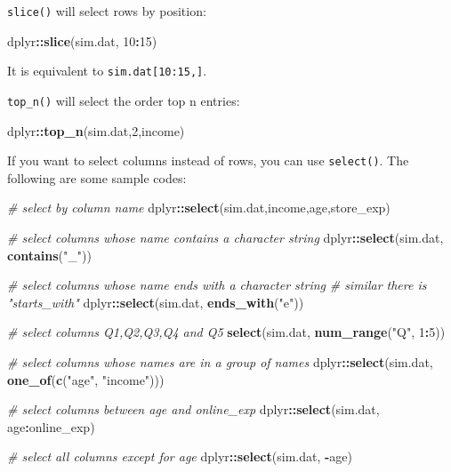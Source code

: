\documentclass[12pt,]{krantz}
\makeatletter
\newenvironment{Shaded}{\begin{snugshade}}{\end{snugshade}}
\newcommand{\KeywordTok}[1]{\textcolor[rgb]{0.27,0.27,0.27}{\textbf{#1}}}
\newcommand{\DecValTok}[1]{\textcolor[rgb]{0.06,0.06,0.06}{#1}}
\newcommand{\StringTok}[1]{\textcolor[rgb]{0.5,0.5,0.5}{#1}}
\newcommand{\CommentTok}[1]{\textcolor[rgb]{0.37,0.37,0.37}{\textit{#1}}}
\newcommand{\OperatorTok}[1]{\textcolor[rgb]{0.43,0.43,0.43}{\textbf{#1}}}
\newcommand{\NormalTok}[1]{#1}
\newenvironment{kframe}{%
\medskip{}
\setlength{\fboxsep}{.8em}
 \def\at@end@of@kframe{}%
 \ifinner\ifhmode%
  \def\at@end@of@kframe{\end{minipage}}%
  \begin{minipage}{\columnwidth}%
 \fi\fi%
 \def\FrameCommand##1{\hskip\@totalleftmargin \hskip-\fboxsep
 \colorbox{shadecolor}{##1}\hskip-\fboxsep
     \hskip-\linewidth \hskip-\@totalleftmargin \hskip\columnwidth}%
 \MakeFramed {\advance\hsize-\width
   \@totalleftmargin\z@ \linewidth\hsize
   \@setminipage}}%
 {\par\unskip\endMakeFramed%
 \at@end@of@kframe}
\renewenvironment{Shaded}{\begin{kframe}}{\end{kframe}}
\theoremstyle{definition}
\theoremstyle{definition}
\theoremstyle{definition}
\theoremstyle{remark}
\makeatother
\begin{document}
\texttt{slice()} will select rows by position:

\begin{Shaded}
\begin{Highlighting}[]
\NormalTok{dplyr}\OperatorTok{::}\KeywordTok{slice}\NormalTok{(sim.dat, }\DecValTok{10}\OperatorTok{:}\DecValTok{15}\NormalTok{) }
\end{Highlighting}
\end{Shaded}

It is equivalent to \texttt{sim.dat{[}10:15,{]}}.

\texttt{top\_n()} will select the order top n entries:

\begin{Shaded}
\begin{Highlighting}[]
\NormalTok{dplyr}\OperatorTok{::}\KeywordTok{top_n}\NormalTok{(sim.dat,}\DecValTok{2}\NormalTok{,income)}
\end{Highlighting}
\end{Shaded}

If you want to select columns instead of rows, you can use
\texttt{select()}. The following are some sample codes:

\begin{Shaded}
\begin{Highlighting}[]
\CommentTok{# select by column name}
\NormalTok{dplyr}\OperatorTok{::}\KeywordTok{select}\NormalTok{(sim.dat,income,age,store_exp)}

\CommentTok{# select columns whose name contains a character string}
\NormalTok{dplyr}\OperatorTok{::}\KeywordTok{select}\NormalTok{(sim.dat, }\KeywordTok{contains}\NormalTok{(}\StringTok{"_"}\NormalTok{))}

\CommentTok{# select columns whose name ends with a character string}
\CommentTok{# similar there is "starts_with"}
\NormalTok{dplyr}\OperatorTok{::}\KeywordTok{select}\NormalTok{(sim.dat, }\KeywordTok{ends_with}\NormalTok{(}\StringTok{"e"}\NormalTok{))}

\CommentTok{# select columns Q1,Q2,Q3,Q4 and Q5}
\KeywordTok{select}\NormalTok{(sim.dat, }\KeywordTok{num_range}\NormalTok{(}\StringTok{"Q"}\NormalTok{, }\DecValTok{1}\OperatorTok{:}\DecValTok{5}\NormalTok{)) }

\CommentTok{# select columns whose names are in a group of names}
\NormalTok{dplyr}\OperatorTok{::}\KeywordTok{select}\NormalTok{(sim.dat, }\KeywordTok{one_of}\NormalTok{(}\KeywordTok{c}\NormalTok{(}\StringTok{"age"}\NormalTok{, }\StringTok{"income"}\NormalTok{)))}

\CommentTok{# select columns between age and online_exp}
\NormalTok{dplyr}\OperatorTok{::}\KeywordTok{select}\NormalTok{(sim.dat, age}\OperatorTok{:}\NormalTok{online_exp)}

\CommentTok{# select all columns except for age}
\NormalTok{dplyr}\OperatorTok{::}\KeywordTok{select}\NormalTok{(sim.dat, }\OperatorTok{-}\NormalTok{age)}
\end{Highlighting}
\end{Shaded}
\end{document}
